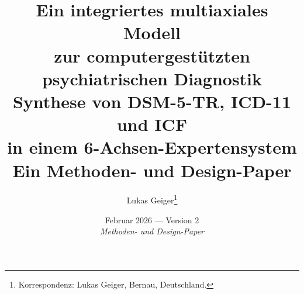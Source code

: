 \documentclass[11pt,a4paper]{article}
\begin{document}

\title{\textbf{\huge Ein integriertes multiaxiales Modell\\zur computergest\"utzten psychiatrischen Diagnostik}\\[0.5em]
\Large Synthese von DSM-5-TR, ICD-11 und ICF\\in einem 6-Achsen-Expertensystem\\[0.3em]
\large Ein Methoden- und Design-Paper}

\author[1]{Lukas Geiger\thanks{Korrespondenz: Lukas Geiger, Bernau, Deutschland.}}

\date{Februar 2026 --- Version 2 \\ \vspace{0.5em} \small \textit{Methoden- und Design-Paper}}

\maketitle
\end{document}
